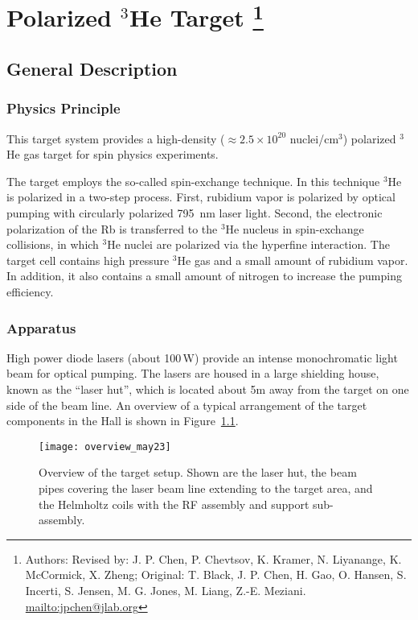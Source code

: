 \chapter[Polarized $^3$He Target]{Polarized $^3$He Target
\footnote{Authors: Revised by: J. P. Chen, P. Chevtsov, K. Kramer, 
N. Liyanange, K. McCormick, X. Zheng; Original: T. Black, J. P. Chen, H. Gao, 
O. Hansen, S. Incerti, S. Jensen, M. G. Jones, M. Liang, Z.-E. Meziani.
\url{mailto:jpchen@jlab.org}}
}

\section{General Description}
\label{sec:general}
\subsection{Physics Principle}

This target system provides a high-density 
($\approx 2.5\times 10^{20}$ nuclei/cm$^3$)
polarized $^3$He gas target for spin physics experiments. 

The target employs the so-called spin-exchange technique.
In this technique $^3$He is polarized in a two-step process.
First, rubidium vapor is polarized by optical pumping with
circularly polarized 795~nm laser light. Second, the electronic polarization
of the Rb is transferred to the $^3$He nucleus in spin-exchange
collisions, in which $^3$He nuclei are polarized via the hyperfine interaction.
The target cell contains high pressure $^3$He gas and a small amount of
rubidium vapor. In addition, it
also contains a small amount of nitrogen to increase the
pumping efficiency.

\subsection{Apparatus}

High power diode lasers (about 100\,W) provide an intense monochromatic
light beam for optical pumping.  The lasers are housed in a large
shielding house, known as the ``laser hut'', which is located about 5m
away from the target on one side of the beam line.  An overview of a
typical arrangement of the target components in the Hall is shown in
Figure~\ref{fig:overview}.

\begin{figure}[p]
\begin{center}
\centerline{\texttt{[image: overview\_may23]}}
\end{center}
\caption{Overview of the target setup. Shown are the laser hut, the
beam pipes covering the laser beam line extending to the target area,
and the Helmholtz coils with the RF assembly and support sub-assembly. }
\label{fig:overview}
\end{figure}

